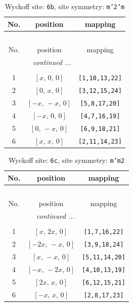 \documentclass[fleqn,8pt]{jsarticle}
\begin{document}
\begin{longtable}{ccc}
\caption{Wyckoff site: {\tt 6b}, site symmetry: {\tt m'2'm}}
 \\
 \hline \hline
No. & position & mapping \\ \hline \endfirsthead

\multicolumn{2}{l}{\tablename\ \thetable{}} \\
 \hline \hline
No. & position & mapping \\ \hline \endhead

 \hline \hline
\multicolumn{2}{r}{\footnotesize\it continued ...} \\ \endfoot

 \hline \hline
\multicolumn{2}{r}{} \\ \endlastfoot

1 & $\left[ x,\, 0,\, 0 \right]$ & {\tt [1,10,13,22]} \\ \hline
2 & $\left[ 0,\, x,\, 0 \right]$ & {\tt [3,12,15,24]} \\ \hline
3 & $\left[ - x,\, - x,\, 0 \right]$ & {\tt [5,8,17,20]} \\ \hline
4 & $\left[ - x,\, 0,\, 0 \right]$ & {\tt [4,7,16,19]} \\ \hline
5 & $\left[ 0,\, - x,\, 0 \right]$ & {\tt [6,9,18,21]} \\ \hline
6 & $\left[ x,\, x,\, 0 \right]$ & {\tt [2,11,14,23]} \\
\end{longtable}
\renewcommand{\arraystretch}{1.2}
\begin{longtable}{ccc}
\caption{Wyckoff site: {\tt 6c}, site symmetry: {\tt m'm2}}
 \\
 \hline \hline
No. & position & mapping \\ \hline \endfirsthead

\multicolumn{2}{l}{\tablename\ \thetable{}} \\
 \hline \hline
No. & position & mapping \\ \hline \endhead

 \hline \hline
\multicolumn{2}{r}{\footnotesize\it continued ...} \\ \endfoot

 \hline \hline
\multicolumn{2}{r}{} \\ \endlastfoot

1 & $\left[ x,\, 2 x,\, 0 \right]$ & {\tt [1,7,16,22]} \\ \hline
2 & $\left[ - 2 x,\, - x,\, 0 \right]$ & {\tt [3,9,18,24]} \\ \hline
3 & $\left[ x,\, - x,\, 0 \right]$ & {\tt [5,11,14,20]} \\ \hline
4 & $\left[ - x,\, - 2 x,\, 0 \right]$ & {\tt [4,10,13,19]} \\ \hline
5 & $\left[ 2 x,\, x,\, 0 \right]$ & {\tt [6,12,15,21]} \\ \hline
6 & $\left[ - x,\, x,\, 0 \right]$ & {\tt [2,8,17,23]} \\
\end{longtable}
\end{document}
